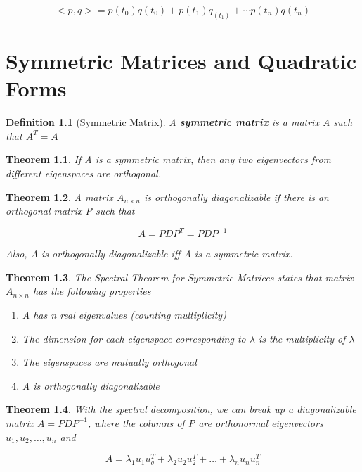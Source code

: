 \documentclass[12pt]{report}
\newtheorem{thm}{Theorem}
\newtheorem{dfn}{Definition}
\newcommand{\mtx}[3]{$#1_{#2\times #3}$}
\begin{document}
\begin{equation}
<p, q> = p(t_0)q(t_0) + p(t_1)q_(t_1) + \cdots p(t_n)q(t_n)
\end{equation}

\chapter{Symmetric Matrices and Quadratic Forms}

\begin{dfn}[Symmetric Matrix]
A \textbf{symmetric matrix} is a matrix A such that $A^T=A$
\end{dfn}

\begin{thm}
If A is a symmetric matrix, then any two eigenvectors from different eigenspaces are orthogonal.
\end{thm}

\begin{thm}
A matrix \mtx{A}{n}{n} is orthogonally diagonalizable if there is an orthogonal matrix P such that 

\begin{equation}
A=PDP^T=PDP^{-1}
\end{equation}

Also, A is orthogonally diagonalizable iff A is a symmetric matrix.
\end{thm}

\begin{thm}
The Spectral Theorem for Symmetric Matrices states that matrix \mtx{A}{n}{n} has the following properties

\begin{enumerate}
\item A has n real eigenvalues (counting multiplicity)
\item The dimension for each eigenspace corresponding to $\lambda$ is the multiplicity of $\lambda$
\item The eigenspaces are mutually orthogonal
\item A is orthogonally diagonalizable
\end{enumerate}

\end{thm}

\begin{thm}
With the spectral decomposition, we can break up a diagonalizable matrix $A=PDP^{-1}$, where the columns of P are orthonormal eigenvectors $u_1, u_2, \ldots, u_n$ and

\begin{equation}
A=\lambda_1 u_1u_q^T+\lambda_2u_2u_2^T+\ldots+\lambda_nu_nu_n^T
\end{equation}

\end{thm}
\end{document}
